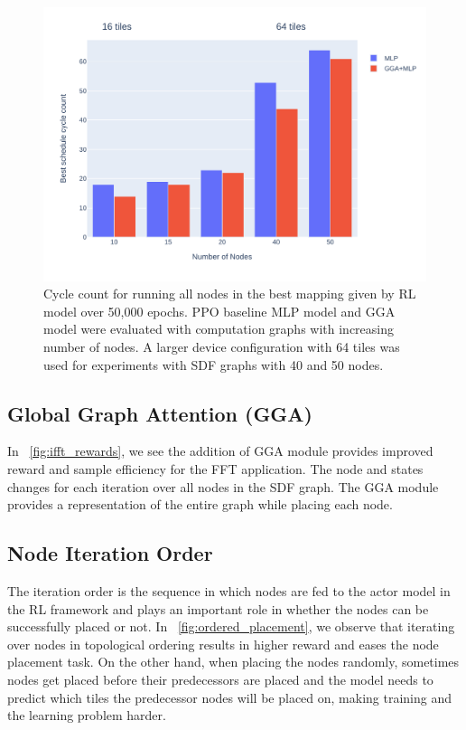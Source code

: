 \begin{figure}[tb]
  \centering
  \includegraphics[width=\linewidth]{fig/nodes_graph.pdf}
  \caption{Cycle count for running all nodes in the best mapping given by RL model over 50,000 epochs. 
  PPO baseline MLP model and GGA model were evaluated with computation graphs with increasing number of nodes. 
  A larger device configuration with 64 tiles was used for experiments with SDF graphs with 40 and 50 nodes. }
  \label{fig:nodes_graph}
\end{figure}

\subsection{Global Graph Attention (GGA)} \label{sec:GGA_result}

In \figurename~\ref{fig:ifft_rewards}, we see the addition of GGA module provides improved reward and sample efficiency for the FFT application. 
The node and states changes for each iteration over all nodes in the SDF graph. The GGA module provides a representation of the entire graph while placing each node.

\subsection{Node Iteration Order}

The iteration order is the sequence in which nodes are fed to the actor model in the RL framework and plays an important role in whether the nodes can be successfully placed or not. 
In \figurename~\ref{fig:ordered_placement}, we observe that iterating over nodes in topological 
ordering results in higher reward and eases the node placement task. 
On the other hand, when placing the nodes randomly, sometimes nodes get placed before their predecessors are placed and the model needs to predict which tiles the predecessor nodes will be placed on, making training and the learning problem harder.

